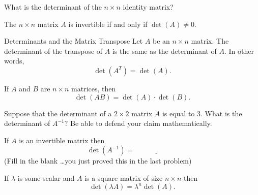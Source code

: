 \begin{problem}
    What is the determinant of the $n \times n$ identity matrix?
\end{problem}
\begin{thm}
    The $n \times n$ matrix $A$ is invertible if and only if $\det(A) \ne 0$.
\end{thm}

\begin{thm}{Determinants and the Matrix Transpose}
    Let $A$ be an $n \times n$ matrix.  The determinant of the transpose of $A$ is the
    same as the determinant of $A$.  In other words,
    \[ \det(A^T) = \det(A). \]
\end{thm}

\begin{thm}
    If $A$ and $B$ are $n \times n$ matrices, then
    \[ \det(AB) = \det(A) \cdot \det(B). \]
\end{thm}

% 

\begin{problem}
    Suppose that the determinant of a $2 \times 2$ matrix $A$ is equal to $3$.  What is the
    determinant of $A^{-1}$?  Be able to defend your claim mathematically.
\end{problem}


%             

\begin{thm}
    If $A$ is an invertible matrix then \[ \det(A^{-1}) = \underline{\hspace{1in}} \] (Fill
    in the blank \ldots you just proved this in the last problem)
\end{thm}

\begin{thm}
    If $\lambda$ is some scalar and $A$ is a square matrix of size $n \times n$ then
    \[ \det(\lambda A) = \lambda^n \det(A). \]
\end{thm}


